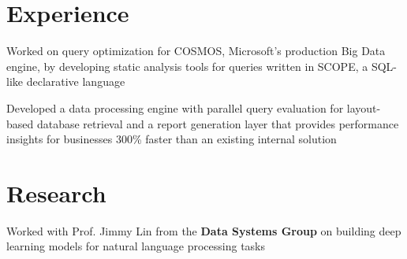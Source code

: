 \documentclass[]{Achyudh_Resume}
\begin{document}
\begin{minipage}[t]{0.32\textwidth}


%
%

\end{minipage} 
\hfill
\begin{minipage}[t]{0.655\textwidth} 


\section{Experience}
Worked on query optimization for COSMOS, Microsoft's production Big Data engine, by developing static analysis tools for queries written in SCOPE, a SQL-like declarative language
\sectionsep

Developed a data processing engine with parallel query evaluation for layout-based database retrieval and a report generation layer that provides performance insights for businesses 300\% faster than an existing internal solution
\sectionsep


\section{Research}
Worked with Prof. Jimmy Lin from the \textbf{Data Systems Group} on building deep learning models for natural language processing tasks
\sectionsep


\end{minipage}
\end{document}
